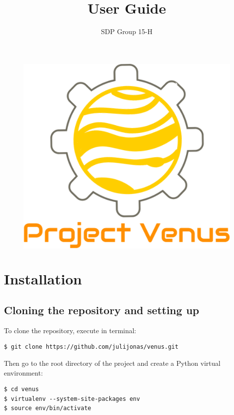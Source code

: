 \documentclass[12pt]{article}
\title{User Guide}
\author{SDP Group 15-H}
\begin{document}
\begin{figure}
    \vspace*{-3em}
    \centering
    \includegraphics[scale=.18]{logo.png}
\end{figure}

\setlength{\droptitle}{-4em}
\maketitle

\section{Installation}

\subsection{Cloning the repository and setting up}

To clone the repository, execute in terminal:
\begin{lstlisting}
$ git clone https://github.com/julijonas/venus.git
\end{lstlisting}

Then go to the root directory of the project and create a Python virtual environment:
\begin{lstlisting}
$ cd venus
$ virtualenv --system-site-packages env
$ source env/bin/activate
\end{lstlisting}
\end{document}
